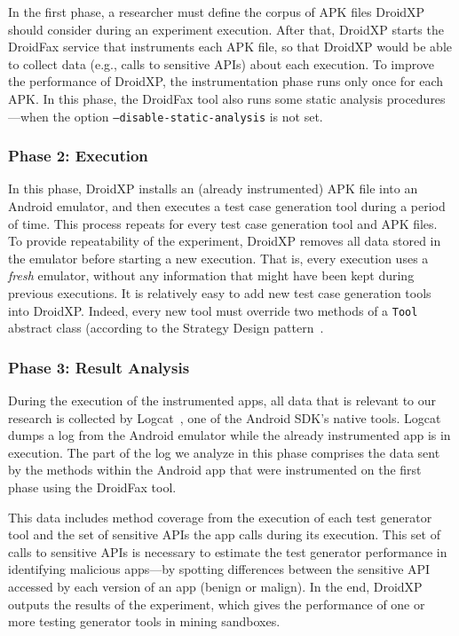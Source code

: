 In the first phase, a researcher must define the corpus of APK files DroidXP should consider during an
experiment execution. After that, DroidXP starts the DroidFax service that instruments each APK file,
so that DroidXP would be able to collect data (e.g., calls to sensitive APIs) about each execution.
To improve the performance of DroidXP, the instrumentation phase runs only once for each APK.
In this phase, the DroidFax tool also runs some static analysis procedures---when the
option \texttt{--disable-static-analysis} is not set.

\subsubsection{Phase 2: Execution}

In this phase, DroidXP installs an (already instrumented) APK file into
an Android emulator, and then executes a test case generation tool
during a period of time. This process repeats for every test case generation
tool and APK files. To provide repeatability of the experiment, DroidXP
removes all data stored in the emulator before starting
a new execution. That is, every execution uses a \emph{fresh} emulator,
without any information that might have been kept during
previous executions. 
It is relatively easy to add new test
case generation tools into DroidXP. Indeed,
every new tool must override two methods
of a \texttt{Tool} abstract class (according to
the Strategy Design pattern~\cite{patterns-book}.

\subsubsection{Phase 3: Result Analysis}

During the execution of the instrumented apps, all data that is relevant to our
research is collected by Logcat~\cite{Logcat}, one of the Android SDK's native tools. Logcat dumps a log from the Android emulator
while the already instrumented app is in execution. The part of the log we analyze in this phase comprises
the data sent by the methods within the Android app that were instrumented on the first
phase using the DroidFax tool. 

This data includes method coverage from the execution of each test generator tool and the
set of sensitive APIs the app calls during its execution. This set of calls to
sensitive APIs is necessary to estimate the test generator performance in identifying malicious apps---by spotting
differences between the sensitive API accessed by each version of an app (benign or malign).
In the end, DroidXP outputs the results of the experiment, which gives the
performance of one or more testing generator tools in mining sandboxes.

